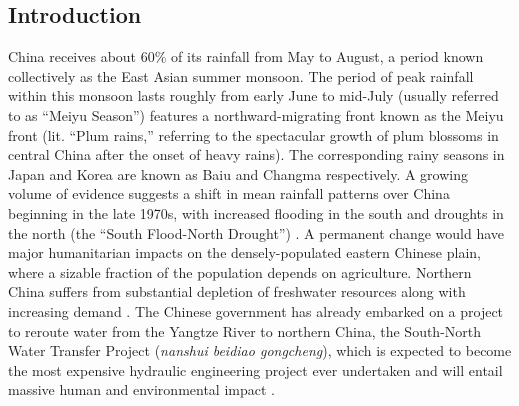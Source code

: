 \documentclass[draft,grl]{AGUTeX}
\begin{document}
\begin{article}




\section{Introduction}
 
 	China receives about 60\% of its rainfall from May to August, a period known collectively as the East Asian summer monsoon. The period of peak rainfall within this monsoon lasts roughly from early June to mid-July (usually referred to as ``Meiyu Season'') features a northward-migrating front known as the Meiyu front (lit. ``Plum rains,'' referring to the spectacular growth of plum blossoms in central China after the onset of heavy rains). The corresponding rainy seasons in Japan and Korea are known as Baiu and Changma respectively. A growing volume of evidence suggests a shift in mean rainfall patterns over China beginning in the late 1970s, with increased flooding in the south and droughts in the north (the ``South Flood-North Drought'') \citep{Hu1997,Gong2002}. A permanent change would have major humanitarian impacts on the densely-populated eastern Chinese plain, where a sizable fraction of the population depends on agriculture. Northern China suffers from substantial depletion of freshwater resources along with increasing demand \citep{Currell2012,Gleeson2012}. The Chinese government has already embarked on a project to reroute water from the Yangtze River to northern China, the South-North Water Transfer Project (\textit{nanshui beidiao gongcheng}), which is expected to become the most expensive hydraulic engineering project ever undertaken and will entail massive human and environmental impact \citep{Magee2011}.
 

\end{article}
\end{document}
